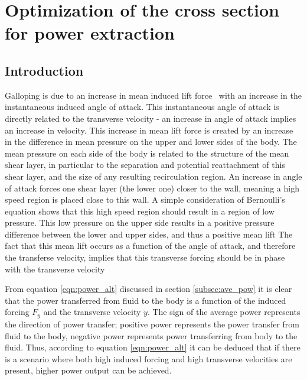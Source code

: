 \chapter{Optimization of the cross section for power extraction}

\section{Introduction}



 Galloping is due to an increase in mean induced lift force \cy\  with an increase in the instantaneous induced angle of attack. This instantaneous angle of attack is directly related to the transverse velocity - an increase in angle of attack implies an increase in velocity. This increase in mean lift force is created by an increase in the difference in mean pressure on the upper and lower sides of the body. The mean pressure on each side of the body is related to the structure of the mean shear layer, in particular to the separation and potential reattachment of this shear layer, and the size of any resulting recirculation region. An increase in angle of attack forces one shear layer (the lower one) closer to the wall, meaning a high speed region is placed close to this wall. A simple consideration of Bernoulli's equation shows that this high speed region should result in a region of low pressure. This low pressure on the upper side results in a positive pressure difference between the lower and upper sides, and thus a positive mean lift The fact that this mean lift occurs as a function of the angle of attack, and therefore the transferse velocity, implies that this transverse forcing should be in phase with the transverse velocity

From equation \ref{eqn:power_alt} discussed in section \ref{subsec:ave_pow} it is clear that the power transferred from fluid to the body is a function of the induced forcing $F_y$ and the transverse velocity $\dot{y}$. The sign of the average power represents the direction of power transfer; positive power represents the power transfer from fluid to the body, negative power represents power transferring from body to the fluid. Thus, according to equation \ref{eqn:power_alt} it can be deduced that if there is a scenario where both high induced forcing and high transverse velocities are present, higher power output can be achieved.


